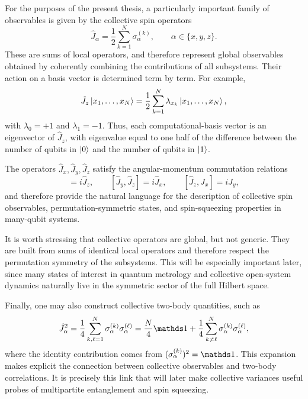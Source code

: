 For the purposes of the present thesis, a particularly important family of observables is given by the collective spin operators
\begin{equation}
	\hat J_\alpha
	=
	\frac{1}{2}\sum_{k=1}^{N}\sigma_\alpha^{(k)},
	\qquad
	\alpha\in\{x,y,z\}.
	\label{eq:intro_qm_collective_spin_operators}
\end{equation}
These are sums of local operators, and therefore represent global observables obtained by coherently combining the contributions of all subsystems. Their action on a basis vector is determined term by term. For example,
\begin{equation}
	\hat J_z\ket{x_1,\dots,x_N}
	=
	\frac{1}{2}\sum_{k=1}^{N}\lambda_{x_k}\ket{x_1,\dots,x_N},
	\label{eq:intro_qm_collective_Jz_action_basis}
\end{equation}
with \(\lambda_0=+1\) and \(\lambda_1=-1\). Thus, each computational-basis vector is an eigenvector of \(\hat J_z\), with eigenvalue equal to one half of the difference between the number of qubits in \(\ket{0}\) and the number of qubits in \(\ket{1}\).

The operators \(\hat J_x,\hat J_y,\hat J_z\) satisfy the angular-momentum commutation relations
\begin{equation}
	[\hat J_x,\hat J_y]=i\hat J_z,
	\qquad
	[\hat J_y,\hat J_z]=i\hat J_x,
	\qquad
	[\hat J_z,\hat J_x]=i\hat J_y,
	\label{eq:intro_qm_collective_spin_commutation_relations}
\end{equation}
and therefore provide the natural language for the description of collective spin observables, permutation-symmetric states, and spin-squeezing properties in many-qubit systems.

It is worth stressing that collective operators are global, but not generic. They are built from sums of identical local operators and therefore respect the permutation symmetry of the subsystems. This will be especially important later, since many states of interest in quantum metrology and collective open-system dynamics naturally live in the symmetric sector of the full Hilbert space.

Finally, one may also construct collective two-body quantities, such as
\begin{equation}
	\hat J_\alpha^2
	=
	\frac{1}{4}\sum_{k,\ell=1}^{N}\sigma_\alpha^{(k)}\sigma_\alpha^{(\ell)}
	=
	\frac{N}{4}\id
	+
	\frac{1}{4}\sum_{k\neq \ell}^{N}\sigma_\alpha^{(k)}\sigma_\alpha^{(\ell)},
	\label{eq:intro_qm_collective_spin_squared_expansion}
\end{equation}
where the identity contribution comes from \((\sigma_\alpha^{(k)})^2=\id\). This expansion makes explicit the connection between collective observables and two-body correlations. It is precisely this link that will later make collective variances useful probes of multipartite entanglement and spin squeezing.

